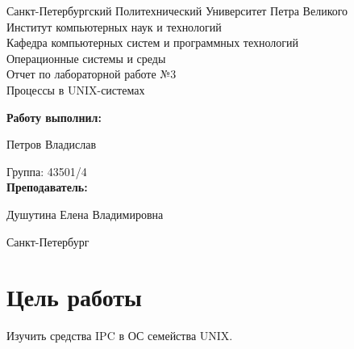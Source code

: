 \documentclass[a4paper]{article}
\begin{document}
\begin{titlepage} %

\begin{center} %

\large Санкт-Петербургский Политехнический Университет Петра Великого\\
\large Институт компьютерных наук и технологий \\
\large Кафедра компьютерных систем и программных технологий\\[6cm]

\huge Операционные системы и среды\\[0.5cm]
\large Отчет по лабораторной работе №3\\[0.1cm]
\large Процессы в UNIX-системах\\[5cm]
\end{center}

\begin{flushright}
\begin{minipage}{0.5\textwidth}
\begin{flushright}
\textbf{Работу выполнил:}

Петров Владислав

{Группа:} 43501/4\\


\textbf{Преподаватель:} 

Душутина Елена Владимировна
\end{flushright}
\end{minipage} %
\end{flushright} %

\vfill %

\begin{center}

\large Санкт-Петербург\\
\large \the\year %

\end{center} %

\thispagestyle{empty} %
\end{titlepage} %

\vfill %

\section{Цель работы}
	Изучить средства IPC в ОС семейства UNIX.
\end{document}
